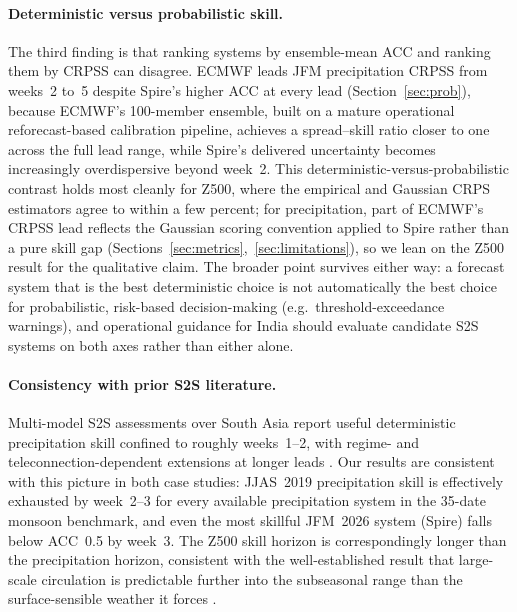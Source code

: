 \documentclass[11pt,a4paper]{article}
\begin{document}
\paragraph{Deterministic versus probabilistic skill.}
The third finding is that ranking systems by ensemble-mean ACC and ranking
them by CRPSS can disagree. ECMWF leads JFM precipitation CRPSS from weeks~2
to~5 despite Spire's higher ACC at every lead (Section~\ref{sec:prob}), because
ECMWF's 100-member ensemble, built on a mature operational reforecast-based
calibration pipeline, achieves a spread--skill ratio closer to one across the
full lead range, while Spire's delivered uncertainty becomes increasingly
overdispersive beyond week~2. This deterministic-versus-probabilistic contrast
holds most cleanly for Z500, where the empirical and Gaussian CRPS estimators
agree to within a few percent; for precipitation, part of ECMWF's CRPSS lead
reflects the Gaussian scoring convention applied to Spire rather than a pure
skill gap (Sections~\ref{sec:metrics},~\ref{sec:limitations}), so we lean on the
Z500 result for the qualitative claim. The broader point survives either way:
a forecast system that is the best deterministic choice is not automatically the
best choice for probabilistic, risk-based decision-making (e.g.\
threshold-exceedance warnings), and operational guidance for India should
evaluate candidate S2S systems on both axes rather than either alone.

\paragraph{Consistency with prior S2S literature.}
Multi-model S2S assessments over South Asia report useful deterministic
precipitation skill confined to roughly weeks~1--2, with regime- and
teleconnection-dependent extensions at longer leads
\citep{deandrade2019,pegion2019,mariotti2020}. Our results are consistent with
this picture in both case studies: JJAS~2019 precipitation skill is effectively
exhausted by week~2--3 for every available precipitation system in the 35-date
monsoon benchmark, and even the most skillful JFM~2026 system (Spire) falls
below ACC~0.5 by week~3. The Z500 skill horizon is correspondingly longer than
the precipitation horizon, consistent with the well-established result that
large-scale circulation is predictable further into the subseasonal range than
the surface-sensible weather it forces \citep{vitart2017,rasp2024}.

\end{document}
